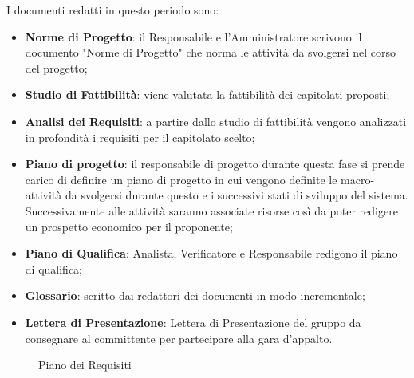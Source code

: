{{	I documenti redatti in questo periodo sono:
	\begin{itemize}
		\item \textbf{Norme di Progetto}: il Responsabile e l'Amministratore scrivono il documento "Norme di Progetto" che norma le attività da svolgersi nel corso del progetto;
		\item \textbf{Studio di Fattibilità}: viene valutata la fattibilità dei capitolati proposti;
		\item \textbf{Analisi dei Requisiti}: a partire dallo studio di fattibilità vengono analizzati in profondità i requisiti per il capitolato scelto;
		\item \textbf{Piano di progetto}: il responsabile di progetto durante questa fase si prende carico di definire un piano di progetto in cui vengono definite le macro-attività da svolgersi durante questo e i successivi stati di sviluppo del sistema. Successivamente alle attività saranno associate risorse così da poter redigere un prospetto economico per il proponente;
		\item \textbf{Piano di Qualifica}: Analista, Verificatore e Responsabile redigono il piano di qualifica;
		\item \textbf{Glossario}: scritto dai redattori dei documenti in modo incrementale;
		\item \textbf{Lettera di Presentazione}: Lettera di Presentazione del gruppo da consegnare al committente per partecipare alla gara d'appalto.
	\end{itemize}

	\begin{landscape}
		\thispagestyle{empty}
		\begin{figure}[H]
			\parbox[c][\textwidth][s]{\linewidth}{
			\centering
			\vspace*{\fill}
			\vspace*{\fill}
			\caption{Piano dei Requisiti}
			\label{fig:pianorequisiti}
			}
		\end{figure}
	\end{landscape}

}}
